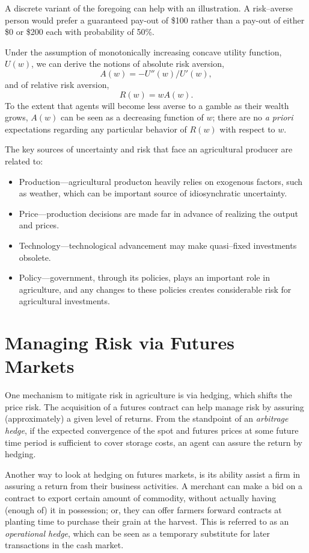 \documentclass[
  oneside]{book}
\providecommand{\tightlist}{%
  \setlength{\itemsep}{0pt}\setlength{\parskip}{0pt}}
\begin{document}
A discrete variant of the foregoing can help with an illustration. A risk--averse person would prefer a guaranteed pay-out of \$100 rather than a pay-out of either \$0 or \$200 each with probability of 50\%.

Under the assumption of monotonically increasing concave utility function, \(U(w)\), we can derive the notions of absolute risk aversion, \[A(w) = -U''(w)/U'(w),\] and of relative risk aversion, \[R(w) = wA(w).\] To the extent that agents will become less averse to a gamble as their wealth grows, \(A(w)\) can be seen as a decreasing function of \(w\); there are no \emph{a priori} expectations regarding any particular behavior of \(R(w)\) with respect to \(w\).

The key sources of uncertainty and risk that face an agricultural producer are related to:

\begin{itemize}
\tightlist
\item
  Production---agricultural producton heavily relies on exogenous factors, such as weather, which can be important source of idiosynchratic uncertainty.
\item
  Price---production decisions are made far in advance of realizing the output and prices.
\item
  Technology---technological advancement may make quasi--fixed investments obsolete.
\item
  Policy---government, through its policies, plays an important role in agriculture, and any changes to these policies creates considerable risk for agricultural investments.
\end{itemize}

\hypertarget{managing-risk-via-futures-markets}{%
\section{Managing Risk via Futures Markets}\label{managing-risk-via-futures-markets}}

One mechanism to mitigate risk in agriculture is via hedging, which shifts the price risk. The acquisition of a futures contract can help manage risk by assuring (approximately) a given level of returns. From the standpoint of an \emph{arbitrage hedge}, if the expected convergence of the spot and futures prices at some future time period is sufficient to cover storage costs, an agent can assure the return by hedging.

Another way to look at hedging on futures markets, is its ability assist a firm in assuring a return from their business activities. A merchant can make a bid on a contract to export certain amount of commodity, without actually having (enough of) it in possession; or, they can offer farmers forward contracts at planting time to purchase their grain at the harvest. This is referred to as an \emph{operational hedge}, which can be seen as a temporary substitute for later transactions in the cash market.
\end{document}
